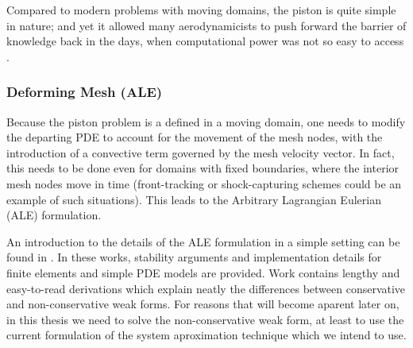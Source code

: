 Compared to modern problems with moving domains,
the piston is quite simple in nature;
and yet it allowed many aerodynamicists to push forward the barrier of knowledge 
back in the days, when computational power was not so easy to access 
\cite{1956_PistonTheoryNewAerodynamicTool}. 

\subsubsection{Deforming Mesh (ALE)}
\label{sec:literature_review_deforming_mesh}
Because the piston problem is a defined in a moving domain,
one needs to modify the departing PDE to account for the movement 
of the mesh nodes, with the introduction of a convective term 
governed by the mesh velocity vector.
In fact, this needs to be done even for domains with fixed boundaries, 
where the interior mesh nodes move in time 
(front-tracking or shock-capturing schemes could be an example
of such situations).
This leads to the Arbitrary Lagrangian Eulerian (ALE) formulation.


An introduction to the details of the ALE formulation in a simple setting
can be found in
\cite{formaggiaALE,
formaggiaALE_secondOrder,
FSIPistonProblem}.
In these works, stability arguments and implementation details for finite elements
and simple PDE models are provided.
Work \cite{formaggiaALE} contains lengthy and easy-to-read derivations which explain neatly
the differences between conservative and non-conservative weak forms.
For reasons that will become aparent later on,
in this thesis we need to solve the \mbox{non-conservative} weak form,
at least to use the current formulation of the system aproximation technique which 
we intend to use.

